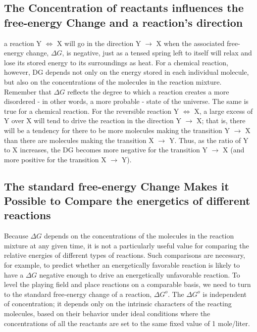 \subsection{The Concentration of reactants influences the free-energy Change and a reaction’s direction}

a reaction Y $\Longleftrightarrow$ X will go in the direction Y $\rightarrow$ X
when the associated free-energy change, $\Delta G$, is negative, just as a tensed
spring left to itself will relax and lose its stored energy to its surroundings
as heat. For a chemical reaction, however, DG depends not only on the
energy stored in each individual molecule, but also on the concentrations
of the molecules in the reaction mixture. Remember that $\Delta G$ reflects the
degree to which a reaction creates a more disordered - in other words, a
more probable - state of the universe.
The same is true for a chemical reaction. For the reversible reaction Y $\Longleftrightarrow$
X, a large excess of Y over X will tend to drive the reaction in the direction
Y $\rightarrow$ X; that is, there will be a tendency for there to be more molecules
making the transition Y $\rightarrow$ X than there are molecules making the transition
X $\rightarrow$ Y. Thus, as the ratio of Y to X increases, the DG becomes more negative
for the transition Y $\rightarrow$ X (and more positive for the transition X $\rightarrow$ Y).

\subsection{The standard free-energy Change Makes it Possible to Compare the energetics of different reactions}

Because $\Delta G$ depends on the concentrations of the molecules in the reaction
mixture at any given time, it is not a particularly useful value for
comparing the relative energies of different types of reactions. Such comparisons
are necessary, for example, to predict whether an energetically
favorable reaction is likely to have a $\Delta G$ negative enough to drive an
energetically unfavorable reaction. To level the playing field and place
reactions on a comparable basis, we need to turn to the standard free-energy
change of a reaction, $\Delta G^{o}$. The $\Delta G^{o}$ is independent of concentration; it
depends only on the intrinsic characters of the reacting molecules, based
on their behavior under ideal conditions where the concentrations of all
the reactants are set to the same fixed value of 1 mole/liter.

